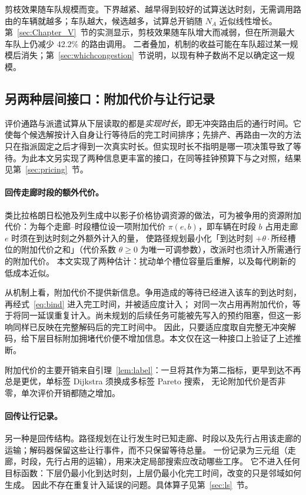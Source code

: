 \documentclass[manuscript,screen,review]{acmart}
\newcommand{\RouteCallCutLo}{42.2\%}     %
\begin{document}
剪枝效果随车队规模而变。下界越紧、越早得到较好的试算送达时刻，无需调用路由的车辆就越多；车队越大，候选越多，试算总开销随 $N_A$ 近似线性增长。
第~\ref{sec:Chapter_V}~节的实测显示，剪枝效果随车队增大而减弱，但在所测最大车队上仍减少 \RouteCallCutLo{} 的路由调用。
二者叠加，机制的收益可能在车队超过某一规模后消失；第~\ref{sec:whichcongestion}~节说明，以现有种子数尚不足以确定这一规模。

\subsection{另两种层间接口：附加代价与让行记录}
\label{sec:interface}

评价通路与派遣试算从下层读取的都是\emph{实现时长}，即无冲突路由后的通行时间。它使每个候选解按计入自身让行等待后的完工时间排序；先排产、再路由一次的方法只在指派固定之后才得到一次真实时长。但实现时长不指明是哪一项决策导致了等待。为此本文另实现了两种信息更丰富的接口，在同等挂钟预算下与之对照，结果见第~\ref{sec:pricing}~节。

\paragraph{回传走廊时段的额外代价。}
类比拉格朗日松弛及列生成中以影子价格协调资源的做法，可为被争用的资源附加代价：为每个走廊--时段槽位设一项附加代价 $\pi(e,b)$，即车辆在时段 $b$ 占用走廊 $e$ 时须在到达时刻之外额外计入的量，
使路径规划最小化「到达时刻 $+\theta\cdot$所经槽位的附加代价之和」（代价系数 $\theta\ge0$ 为唯一可调参数），改派时也须计入所需通行的附加代价。
本文实现了两种估计：扰动单个槽位容量后重解，以及每代刷新的低成本近似。

从机制上看，附加代价不提供新信息。争用造成的等待已经进入该车的到达时刻，再经式~\eqref{eq:bind} 进入完工时间，并被适应度计入；
对同一次占用再附加代价，等于将同一延误重复计入。尚未规划的后续任务可能被先写入的预约阻塞，但这一影响同样已反映在完整解码后的完工时间中。
因此，只要适应度取自完整无冲突解码，给下层目标附加拥堵代价便不增加信息。本文仅在这一种接口上验证了上述推断。

附加代价的主要开销来自引理~\ref{lem:label}：一旦将其作为第二指标，更早到达不再总是更优，单标签 Dijkstra 须换成多标签 Pareto 搜索，
无论附加代价是否非零，单次评价开销都随之增加。


\paragraph{回传让行记录。}
另一种是回传结构。路径规划在让行发生时已知走廊、时段以及先行占用该走廊的运输；解码器保留这些让行事件，而不只保留等待总量。
一份记录为三元组（走廊，时段，先行占用的运输），用来决定局部搜索应改动哪些工序。
它不进入任何目标函数：下层仍最小化到达时刻，上层仍最小化完工时间，改变的只是邻域如何生成。
因此不存在重复计入延误的问题。具体算子见第~\ref{sec:ls}~节。
\end{document}
